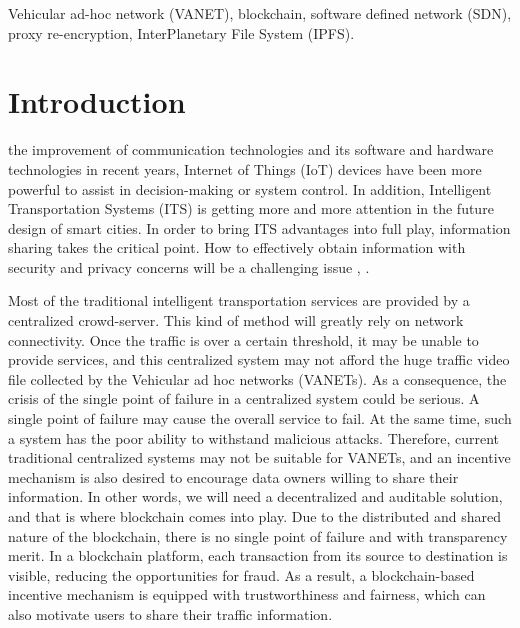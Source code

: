 \documentclass[journal]{IEEEtran}
\begin{document}
	\begin{IEEEkeywords}
		Vehicular ad-hoc network (VANET), blockchain, software defined network (SDN), proxy re-encryption, InterPlanetary File System (IPFS).
	\end{IEEEkeywords}
	
	\section{Introduction}
	\label{chap:intro}

     the improvement of communication technologies and its software and hardware technologies in recent years, Internet of Things (IoT) devices have been more powerful to assist in decision-making or system control. In addition, Intelligent Transportation Systems (ITS) is getting more and more attention in the future design of smart cities\cite{sov2014}\cite{bbi2017}. In order to bring ITS advantages into full play, information sharing takes the critical point. How to effectively obtain information with security and privacy concerns will be a challenging issue \cite{sii2018}, \cite{sva2007}.

    Most of the traditional intelligent transportation services are provided by a centralized crowd-server. This kind of method will greatly rely on network connectivity. Once the traffic is over a certain threshold, it may be unable to provide services, and this centralized system may not afford the huge traffic video file collected by the Vehicular ad hoc networks (VANETs). As a consequence, the crisis of the single point of failure in a centralized system could be serious. A single point of failure may cause the overall service to fail. At the same time, such a system has the poor ability to withstand malicious attacks. Therefore, current traditional centralized systems may not be suitable for VANETs, and an incentive mechanism is also desired to encourage data owners willing to share their information. In other words, we will need a decentralized and auditable solution, and that is where blockchain comes into play\cite{bto2020}. Due to the distributed and shared nature of the blockchain, there is no single point of failure and with transparency merit. In a blockchain platform, each transaction from its source to destination is visible, reducing the opportunities for fraud. As a result, a blockchain-based incentive mechanism is equipped with trustworthiness and fairness, which can also motivate users to share their traffic information.
\end{document}
